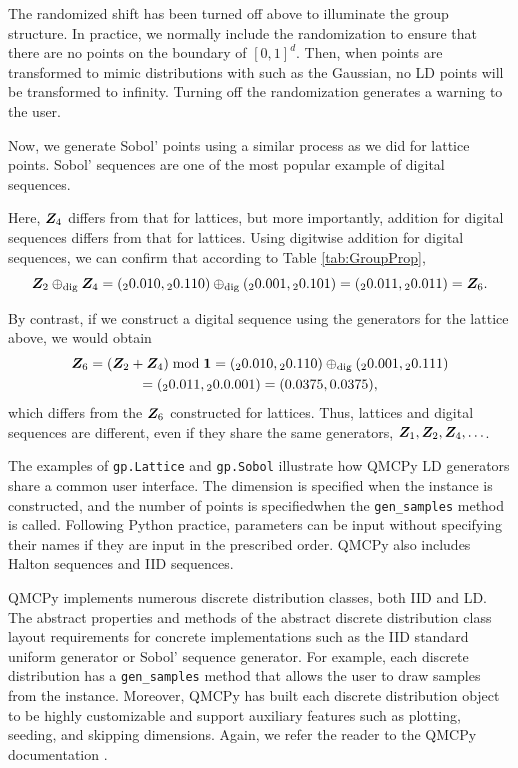 \documentclass[graybox,footinfo]{svmult}
\newcommand{\dig}{\textup{dig}}
\begin{document}
The randomized shift has been turned off above to illuminate the group structure.  In practice, we normally include the randomization to ensure that there are no points on the boundary of $[0,1]^d$.  Then, when points are transformed to mimic distributions with such as the Gaussian, no LD points will be transformed to infinity.  Turning off the randomization generates a warning to the user.

Now, we generate Sobol' points using a similar process as we did for lattice points.  Sobol' sequences are one of the most popular example of digital sequences.

Here, ${\boldsymbol{Z}}_4$ differs from that for lattices, but more importantly, addition for digital sequences differs from that for lattices.  Using digitwise addition for digital sequences, we can confirm that according to Table \ref{tab:GroupProp},
\[
\bsZ_2 \oplus_{\dig} \bsZ_4 = ({}_20.010,{}_20.110)  \oplus_{\dig} ({}_20.001,{}_20.101) = ({}_20.011,{}_20.011) = \bsZ_6.
\]

By contrast, if we construct a digital sequence using the generators for the lattice above, we would obtain
\begin{multline*}
\bsZ_6 = (\bsZ_2 + \bsZ_4) \bmod \bsone  = ({}_20.010,{}_20.110)  \oplus_{\dig} ({}_20.001,{}_20.111)  \\
= ({}_20.011,{}_20.0.001) = (0.0375, 0.0375),
\end{multline*}
which differs from the ${\boldsymbol{Z}}_6$ constructed for lattices.  Thus, lattices and digital sequences are different, even if they share the same generators, ${\boldsymbol{Z}}_1, {\boldsymbol{Z}}_2, {\boldsymbol{Z}}_4, \ldots$.

The examples of \texttt{gp.Lattice} and \texttt{gp.Sobol} illustrate how QMCPy LD generators share a common user interface.  The dimension is specified when the instance is constructed, and the number of points is specifiedwhen the \texttt{gen\_samples} method is called.  Following Python practice, parameters can be input without specifying their names if they are input in the prescribed order.  QMCPy also includes Halton sequences and IID sequences.




QMCPy implements numerous discrete distribution classes, both IID and LD. The abstract properties and methods of the abstract discrete distribution class layout requirements for concrete implementations such as the IID standard uniform generator or Sobol' sequence generator. For example, each discrete distribution has a \texttt{gen\_samples} method that allows the user to draw samples from the instance. Moreover, QMCPy has built each discrete distribution object to be highly customizable and support auxiliary features such as plotting, seeding, and skipping dimensions. Again, we refer the reader to the QMCPy documentation \cite{QMCPyDocs}.
\end{document}
